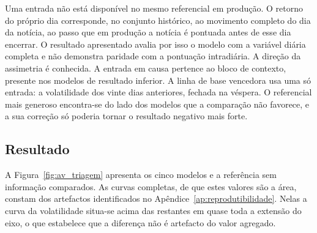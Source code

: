 Uma entrada não está disponível no mesmo referencial em produção. O retorno do próprio dia
corresponde, no conjunto histórico, ao movimento completo do dia da notícia, ao passo que em produção
a notícia é pontuada antes de esse dia encerrar. O resultado apresentado avalia por isso o modelo com
a variável diária completa e não demonstra paridade com a pontuação intradiária. A direção da assimetria é conhecida. A entrada em causa pertence ao bloco de contexto, presente
nos modelos de resultado inferior. A linha de base vencedora usa uma só entrada: a volatilidade
dos vinte dias anteriores, fechada na véspera. O referencial mais generoso
encontra-se do lado dos modelos que a comparação não favorece, e a sua correção só poderia tornar o
resultado negativo mais forte.

\subsection{Resultado}

A Figura~\ref{fig:av_triagem} apresenta os cinco modelos e a referência sem informação comparados. As curvas completas, de que estes valores são a área, constam dos artefactos identificados no
Apêndice~\ref{ap:reprodutibilidade}. Nelas a curva da volatilidade situa-se acima das restantes em
quase toda a extensão do eixo, o que estabelece que a diferença não é artefacto do valor agregado.

